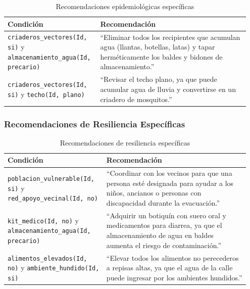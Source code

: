 \documentclass[12pt, letterpaper]{article}
\begin{document}
\begin{table}[H]
\centering
\caption{Recomendaciones epidemiológicas específicas}
\label{tab:rec_epidemiologicas_esp}
\begin{tabular}{@{}p{0.35\linewidth}p{0.60\linewidth}@{}}
\toprule
\textbf{Condición} & \textbf{Recomendación} \\ \midrule
\texttt{criaderos\_vectores(Id, si)} y \texttt{almacenamiento\_agua(Id, precario)} & ``Eliminar todos los recipientes que acumulan agua (llantas, botellas, latas) y tapar herméticamente los baldes y bidones de almacenamiento.'' \\
\texttt{criaderos\_vectores(Id, si)} y \texttt{techo(Id, plano)} & ``Revisar el techo plano, ya que puede acumular agua de lluvia y convertirse en un criadero de mosquitos.'' \\ \bottomrule
\end{tabular}
\end{table}

\subsubsection*{Recomendaciones de Resiliencia Específicas}

\begin{table}[H]
\centering
\caption{Recomendaciones de resiliencia específicas}
\label{tab:rec_resiliencia_esp}
\begin{tabular}{@{}p{0.38\linewidth}p{0.57\linewidth}@{}}
\toprule
\textbf{Condición} & \textbf{Recomendación} \\ \midrule
\texttt{poblacion\_vulnerable(Id, si)} y \texttt{red\_apoyo\_vecinal(Id, no)} & ``Coordinar con los vecinos para que una persona esté designada para ayudar a los niños, ancianos o personas con discapacidad durante la evacuación.'' \\ \addlinespace
\texttt{kit\_medico(Id, no)} y \texttt{almacenamiento\_agua(Id, precario)} & ``Adquirir un botiquín con suero oral y medicamentos para diarrea, ya que el almacenamiento de agua en baldes aumenta el riesgo de contaminación.'' \\ \addlinespace
\texttt{alimentos\_elevados(Id, no)} y \texttt{ambiente\_hundido(Id, si)} & ``Elevar todos los alimentos no perecederos a repisas altas, ya que el agua de la calle puede ingresar por los ambientes hundidos.'' \\ \bottomrule
\end{tabular}
\end{table}
\end{document}
